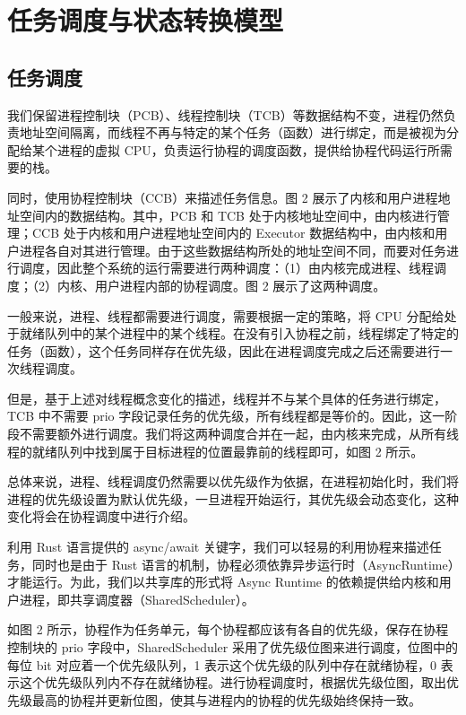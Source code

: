 \section{任务调度与状态转换模型}

\subsection{任务调度}

我们保留进程控制块（PCB）、线程控制块（TCB）等数据结构不变，进程仍然负责地址空间隔离，而线程不再与特定的某个任务（函数）进行绑定，而是被视为分配给某个进程的虚拟 CPU，负责运行协程的调度函数，提供给协程代码运行所需要的栈。

同时，使用协程控制块（CCB）来描述任务信息。图 2 展示了内核和用户进程地址空间内的数据结构。其中，PCB 和 TCB 处于内核地址空间中，由内核进行管理；CCB 处于内核和用户进程地址空间内的 Executor 数据结构中，由内核和用户进程各自对其进行管理。由于这些数据结构所处的地址空间不同，而要对任务进行调度，因此整个系统的运行需要进行两种调度：（1）由内核完成进程、线程调度；（2）内核、用户进程内部的协程调度。图 2 展示了这两种调度。


一般来说，进程、线程都需要进行调度，需要根据一定的策略，将 CPU 分配给处于就绪队列中的某个进程中的某个线程。在没有引入协程之前，线程绑定了特定的任务（函数），这个任务同样存在优先级，因此在进程调度完成之后还需要进行一次线程调度。

但是，基于上述对线程概念变化的描述，线程并不与某个具体的任务进行绑定，TCB 中不需要 prio 字段记录任务的优先级，所有线程都是等价的。因此，这一阶段不需要额外进行调度。我们将这两种调度合并在一起，由内核来完成，从所有线程的就绪队列中找到属于目标进程的位置最靠前的线程即可，如图 2 所示。

总体来说，进程、线程调度仍然需要以优先级作为依据，在进程初始化时，我们将进程的优先级设置为默认优先级，一旦进程开始运行，其优先级会动态变化，这种变化将会在协程调度中进行介绍。


利用 Rust 语言提供的 async/await 关键字，我们可以轻易的利用协程来描述任务，同时也是由于 Rust 语言的机制，协程必须依靠异步运行时（AsyncRuntime）才能运行。为此，我们以共享库的形式将 Async Runtime 的依赖提供给内核和用户进程，即共享调度器（SharedScheduler）。

如图 2 所示，协程作为任务单元，每个协程都应该有各自的优先级，保存在协程控制块的 prio 字段中，SharedScheduler 采用了优先级位图来进行调度，位图中的每位 bit 对应着一个优先级队列，1 表示这个优先级的队列中存在就绪协程，0 表示这个优先级队列内不存在就绪协程。进行协程调度时，根据优先级位图，取出优先级最高的协程并更新位图，使其与进程内的协程的优先级始终保持一致。

